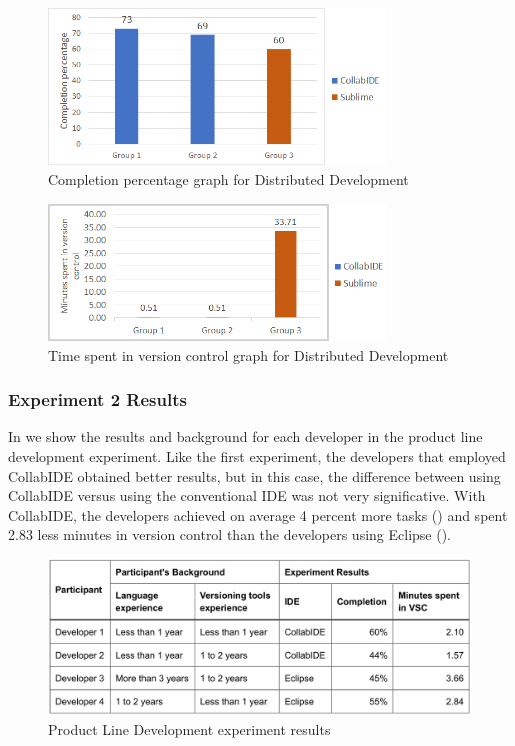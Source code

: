 \begin{figure}[htbp]
  \centering
  \includegraphics[width=0.8\textwidth]{img/completionCollaborative}
  \caption{Completion percentage graph for Distributed Development}
  \label{fig:completionCollaborative}
\end{figure}

\begin{figure}[htbp]
  \centering
  \includegraphics[width=0.8\textwidth]{img/versionControlCollaborative}
  \caption{Time spent in version control graph for Distributed Development}
  \label{fig:{img/versionControlCollaborative}}
\end{figure}

\subsubsection{Experiment 2 Results}

In  we show the results and background for each developer in the product line development experiment. Like the first experiment, the developers that employed CollabIDE obtained better results, but in this case, the difference between using CollabIDE versus using the conventional IDE was not very significative. With CollabIDE, the developers achieved on average 4 percent more tasks () and spent 2.83 less minutes in version control than the developers using Eclipse ().

\begin{figure}[htbp]
  \centering
  \includegraphics[width=1\textwidth]{img/resultsTableProductLine}
  \caption{Product Line Development experiment results}
  \label{fig:resultsTableProductLine}
\end{figure}

